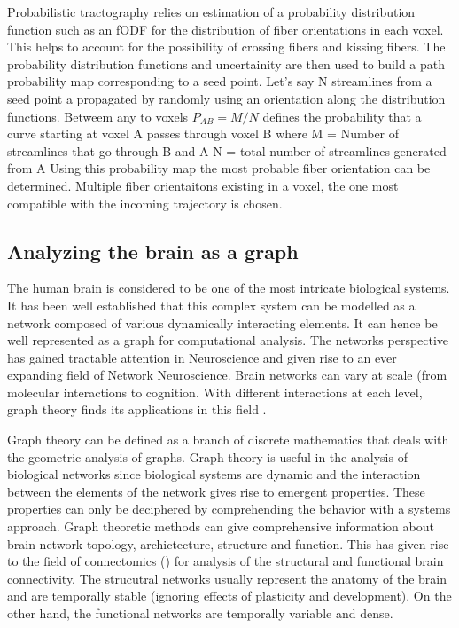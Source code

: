 \documentclass[msthesis.tex]{subfiles}
\begin{document}
Probabilistic tractography relies on estimation of a probability distribution function such as an fODF for the distribution of fiber orientations in each voxel. This helps to account for the possibility of crossing fibers and kissing fibers. The probability distribution functions and uncertainity are then used to build a path probability map corresponding to a seed point. Let's say N streamlines from a seed point a propagated by randomly using an orientation along the distribution functions. Betweem any to voxels 
$P_{AB}= M/N$  defines the probability that a curve starting at voxel A passes through voxel B
where M = Number of streamlines that go through B and A
N = total number of streamlines generated from A
Using this probability map the most probable fiber orientation can be determined. Multiple fiber orientaitons existing in a voxel, the one most compatible with the incoming trajectory is chosen\citep{behrens2003non}.
\subsection{Analyzing the brain as a graph}
\label{sec:braingraph}
The human brain is considered to be one of the most intricate biological systems. It has been well established that this complex system can be modelled as a network composed of various dynamically interacting elements. It can hence be well represented as a graph for computational analysis. The networks perspective has gained tractable attention in Neuroscience and given rise to an ever expanding field of Network Neuroscience. Brain networks can vary at scale (from molecular interactions to cognition. With different interactions at each level, graph theory finds its applications in this field \cite{sporns2018graph}. 

Graph theory can be defined as a branch of discrete mathematics that deals with the geometric analysis of graphs. Graph theory is useful in the analysis of biological networks since biological systems are dynamic and the interaction between the elements of the network gives rise to emergent properties. These properties can only be deciphered by comprehending the behavior with a systems approach. Graph theoretic methods can give comprehensive information about brain network topology, archictecture, structure and function. This has given rise to the field of connectomics (\citep{sporns2005human}) for analysis of the structural and functional brain connectivity. The strucutral networks usually represent the anatomy of the brain and are temporally stable (ignoring effects of plasticity and development). On the other hand, the functional networks are temporally variable and dense.
\end{document}
